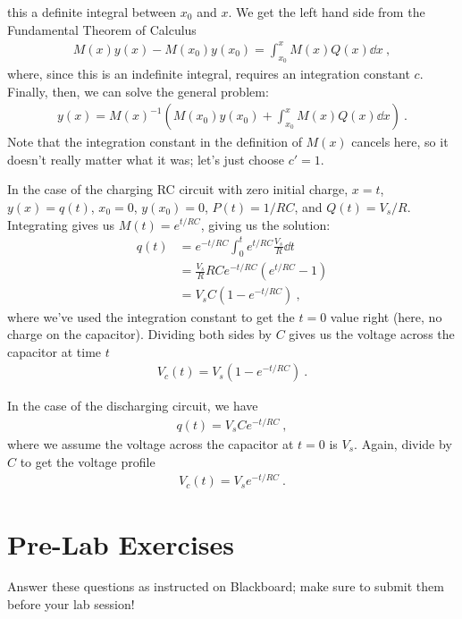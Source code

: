 \documentclass[12pt]{article}
\begin{document}
this a definite integral between $x_0$ and $x$.  We get the left hand
side from the Fundamental Theorem of Calculus
\begin{gather*}
  M(x) y(x) - M(x_0) y(x_0) = \int_{x_0}^x M(x) Q(x) \dd x\ ,
\end{gather*}
where, since this is an indefinite integral, requires an integration
constant $c$.  Finally, then, we can solve the general problem:
\begin{gather*}
  y(x) = M(x)^{-1} \left( M(x_0) y(x_0) + \int_{x_0}^x M(x) Q(x) \dd x
  \right) \ . 
\end{gather*}
Note that the integration constant in the definition of $M(x)$ cancels
here, so it doesn't really matter what it was; let's just choose $c' =
1$. 

In the case of the charging RC circuit with zero initial charge, $x =
t$, $y(x) = q(t)$, $x_0 = 0$, $y(x_0) = 0$, $P(t) = 1/RC$, and $Q(t) =
V_s/R$.  Integrating gives us $M(t) = e^{t/RC}$, giving us the
solution:
\begin{align*}
  q(t) &= e^{-t/RC} \int_0^t e^{t/RC} \frac{V_s}{R} \dd t\\
  &= \frac{V_s}{R} RC e^{-t/RC} \left( e^{t/RC} -1 \right)\\
  &= V_s C \left( 1 - e^{-t/RC} \right)\ ,
\end{align*}
where we've used the integration constant to get the $t=0$ value right
(here, no charge on the capacitor).  Dividing both sides by $C$ gives
us the voltage across the capacitor at time $t$
\begin{gather*}
  V_c(t) = V_s \left( 1 - e^{-t/RC} \right)\ .
\end{gather*}

In the case of the discharging circuit, we have 
\begin{gather*}
  q(t) = V_s C e^{-t/RC}\ ,
\end{gather*}
where we assume the voltage across the capacitor at $t=0$ is $V_s$.
Again, divide by $C$ to get the voltage profile
\begin{gather*}
  V_c(t) = V_s e^{-t/RC}\ .
\end{gather*}

\newpage

\section*{Pre-Lab Exercises}

Answer these questions as instructed on Blackboard; make sure to
submit them before your lab session!
\end{document}
